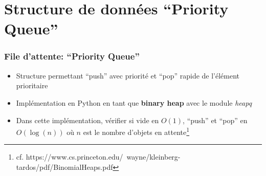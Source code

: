 \documentclass[]{beamer}
\begin{document}
\section{Structure de données ``Priority Queue''}
\begin{frame}
  \frametitle{File d'attente: ``Priority Queue''}
  \begin{itemize}
  \item Structure permettant ``push'' avec priorité et ``pop'' rapide de
    l'élément prioritaire
  \item Implémentation en Python en tant que \textbf{binary heap} avec le module \textit{heapq}
  \item Dans cette implémentation, vérifier si vide en $O(1)$, ``push'' et
    ``pop'' en $O\left(\log(n)\right)$ où $n$ est le nombre d'objets en attente\footnote{cf. https://www.cs.princeton.edu/~wayne/kleinberg-tardos/pdf/BinomialHeaps.pdf}
  \end{itemize}
\end{frame}
\end{document}
